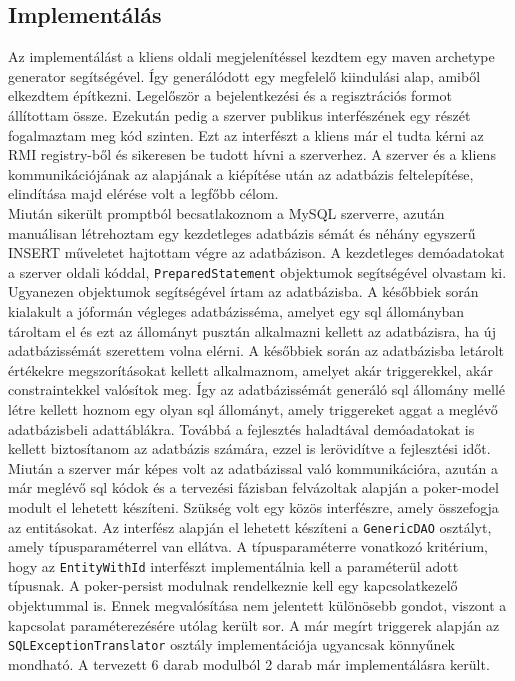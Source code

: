 \subsection{Implementálás}
Az implementálást a kliens oldali megjelenítéssel kezdtem egy maven archetype generator segítségével. Így generálódott egy megfelelő kiindulási alap, amiből elkezdtem építkezni. Legelőször a bejelentkezési és a regisztrációs formot állítottam össze. Ezekután pedig a szerver publikus interfészének egy részét fogalmaztam meg kód szinten. Ezt az interfészt a kliens már el tudta kérni az RMI registry-ből \cite{RMI} és sikeresen be tudott hívni a szerverhez. A szerver és a kliens kommunikációjának az alapjának a kiépítése után az adatbázis feltelepítése, elindítása majd elérése volt a legfőbb célom. \\
Miután sikerült promptból becsatlakoznom a MySQL szerverre, azután manuálisan létrehoztam egy kezdetleges adatbázis sémát és néhány egyszerű INSERT műveletet hajtottam végre az adatbázison. A kezdetleges demóadatokat a szerver oldali kóddal, \texttt{PreparedStatement} objektumok segítségével olvastam ki. Ugyanezen objektumok segítségével írtam az adatbázisba. A későbbiek során kialakult a jóformán végleges adatbázisséma, amelyet egy sql állományban tároltam el és ezt az állományt pusztán alkalmazni kellett az adatbázisra, ha új adatbázissémát szerettem volna elérni. A későbbiek során az adatbázisba letárolt értékekre megszorításokat kellett alkalmaznom, amelyet akár triggerekkel, akár constraintekkel valósítok meg. Így az adatbázissémát generáló sql állomány mellé létre kellett hoznom egy olyan sql állományt, amely triggereket aggat a meglévő adatbázisbeli adattáblákra. Továbbá a fejlesztés haladtával demóadatokat is kellett biztosítanom az adatbázis számára, ezzel is lerövidítve a fejlesztési időt. \\
Miután a szerver már képes volt az adatbázissal való kommunikációra, azután a már meglévő sql kódok és a tervezési fázisban felvázoltak alapján a poker-model modult el lehetett készíteni. Szükség volt egy közös interfészre, amely összefogja az entitásokat. Az interfész alapján el lehetett készíteni a \texttt{GenericDAO} osztályt, amely típusparaméterrel van ellátva. A típusparaméterre vonatkozó kritérium, hogy az \texttt{EntityWithId} interfészt implementálnia kell a paraméterül adott típusnak. A poker-persist modulnak rendelkeznie kell egy kapcsolatkezelő objektummal is. Ennek megvalósítása nem jelentett különösebb gondot, viszont a kapcsolat paraméterezésére utólag került sor. A már megírt triggerek alapján az \texttt{SQLExceptionTranslator} osztály implementációja ugyancsak könnyűnek mondható. A tervezett 6 darab modulból 2 darab már implementálásra került. \\
